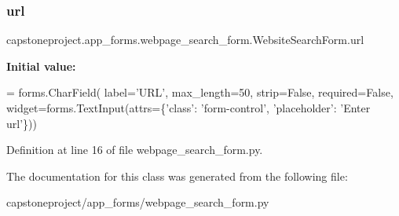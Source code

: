 \subsubsection{\texorpdfstring{url}{url}}
{\footnotesize\ttfamily capstoneproject.\+app\+\_\+forms.\+webpage\+\_\+search\+\_\+form.\+Website\+Search\+Form.\+url\hspace{0.3cm}{\ttfamily [static]}}

{\bfseries Initial value\+:}
\begin{DoxyCode}
=  forms.CharField(
        label=\textcolor{stringliteral}{'URL'},
        max\_length=50,
        strip=\textcolor{keyword}{False},
        required=\textcolor{keyword}{False},
        widget=forms.TextInput(attrs=\{\textcolor{stringliteral}{'class'}: \textcolor{stringliteral}{'form-control'}, \textcolor{stringliteral}{'placeholder'}: \textcolor{stringliteral}{'Enter url'}\}))
\end{DoxyCode}


Definition at line 16 of file webpage\+\_\+search\+\_\+form.\+py.



The documentation for this class was generated from the following file\+:\begin{DoxyCompactItemize}
\item 
capstoneproject/app\+\_\+forms/webpage\+\_\+search\+\_\+form.\+py\end{DoxyCompactItemize}
